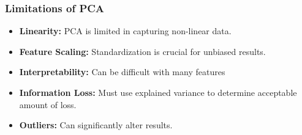 \documentclass[aspectratio=169]{beamer}
\begin{document}
\begin{frame}
\begin{itemize}
    \end{itemize}
    \end{frame}

\begin{frame}
    \frametitle{Limitations of PCA}
    \begin{itemize}
    \item \textbf{Linearity:} PCA is limited in capturing non-linear data.
    \item \textbf{Feature Scaling:} Standardization is crucial for unbiased results.
    \item \textbf{Interpretability:} Can be difficult with many features
    \item \textbf{Information Loss:} Must use explained variance to determine acceptable amount of loss.
    \item \textbf{Outliers:} Can significantly alter results.
    \end{itemize}
    \end{frame}
    
\end{document}
